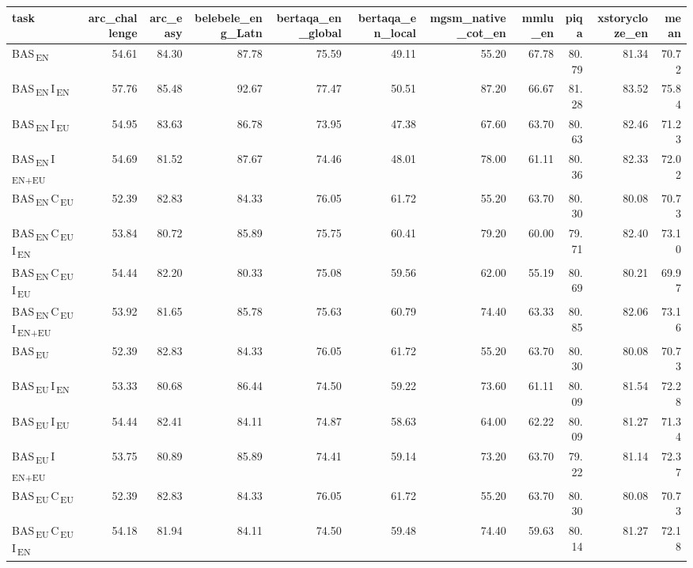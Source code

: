 \begin{tabular}{lrrrrrrrrrr}
\toprule
task & arc_challenge & arc_easy & belebele_eng_Latn & bertaqa_en_global & bertaqa_en_local & mgsm_native_cot_en & mmlu_en & piqa & xstorycloze_en & mean \\
\midrule
BAS\textsubscript{\,EN} & 54.61 & 84.30 & 87.78 & 75.59 & 49.11 & 55.20 & 67.78 & 80.79 & 81.34 & 70.72 \\
BAS\textsubscript{\,EN}\,I\textsubscript{\,EN} & 57.76 & 85.48 & 92.67 & 77.47 & 50.51 & 87.20 & 66.67 & 81.28 & 83.52 & 75.84 \\
BAS\textsubscript{\,EN}\,I\textsubscript{\,EU} & 54.95 & 83.63 & 86.78 & 73.95 & 47.38 & 67.60 & 63.70 & 80.63 & 82.46 & 71.23 \\
BAS\textsubscript{\,EN}\,I\textsubscript{\,EN+EU} & 54.69 & 81.52 & 87.67 & 74.46 & 48.01 & 78.00 & 61.11 & 80.36 & 82.33 & 72.02 \\
BAS\textsubscript{\,EN}\,C\textsubscript{\,EU} & 52.39 & 82.83 & 84.33 & 76.05 & 61.72 & 55.20 & 63.70 & 80.30 & 80.08 & 70.73 \\
BAS\textsubscript{\,EN}\,C\textsubscript{\,EU}\,I\textsubscript{\,EN} & 53.84 & 80.72 & 85.89 & 75.75 & 60.41 & 79.20 & 60.00 & 79.71 & 82.40 & 73.10 \\
BAS\textsubscript{\,EN}\,C\textsubscript{\,EU}\,I\textsubscript{\,EU} & 54.44 & 82.20 & 80.33 & 75.08 & 59.56 & 62.00 & 55.19 & 80.69 & 80.21 & 69.97 \\
BAS\textsubscript{\,EN}\,C\textsubscript{\,EU}\,I\textsubscript{\,EN+EU} & 53.92 & 81.65 & 85.78 & 75.63 & 60.79 & 74.40 & 63.33 & 80.85 & 82.06 & 73.16 \\
BAS\textsubscript{\,EU} & 52.39 & 82.83 & 84.33 & 76.05 & 61.72 & 55.20 & 63.70 & 80.30 & 80.08 & 70.73 \\
BAS\textsubscript{\,EU}\,I\textsubscript{\,EN} & 53.33 & 80.68 & 86.44 & 74.50 & 59.22 & 73.60 & 61.11 & 80.09 & 81.54 & 72.28 \\
BAS\textsubscript{\,EU}\,I\textsubscript{\,EU} & 54.44 & 82.41 & 84.11 & 74.87 & 58.63 & 64.00 & 62.22 & 80.09 & 81.27 & 71.34 \\
BAS\textsubscript{\,EU}\,I\textsubscript{\,EN+EU} & 53.75 & 80.89 & 85.89 & 74.41 & 59.14 & 73.20 & 63.70 & 79.22 & 81.14 & 72.37 \\
BAS\textsubscript{\,EU}\,C\textsubscript{\,EU} & 52.39 & 82.83 & 84.33 & 76.05 & 61.72 & 55.20 & 63.70 & 80.30 & 80.08 & 70.73 \\
BAS\textsubscript{\,EU}\,C\textsubscript{\,EU}\,I\textsubscript{\,EN} & 54.18 & 81.94 & 84.11 & 74.50 & 59.48 & 74.40 & 59.63 & 80.14 & 81.27 & 72.18 \\

\end{tabular}
